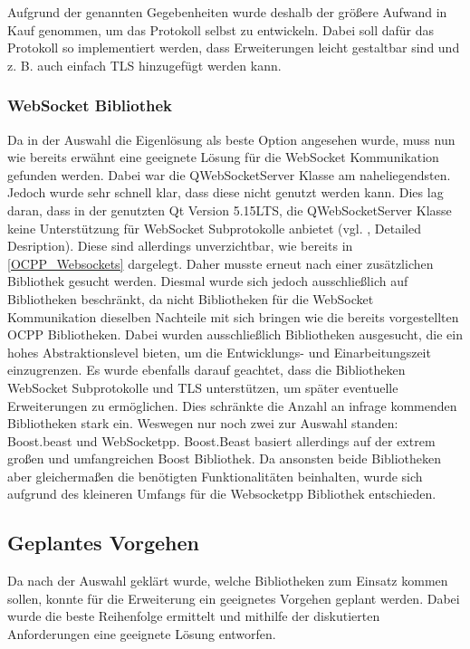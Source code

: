 \noindent Aufgrund der genannten Gegebenheiten wurde deshalb der größere Aufwand in Kauf genommen, um das Protokoll selbst zu entwickeln. Dabei soll dafür das Protokoll so implementiert werden, dass Erweiterungen leicht gestaltbar sind und z. B. auch einfach TLS hinzugefügt werden kann.
\subsubsection{WebSocket Bibliothek}
Da in der Auswahl die Eigenlösung als beste Option angesehen wurde, muss nun wie bereits erwähnt eine geeignete Lösung für die WebSocket Kommunikation gefunden werden. Dabei war die QWebSocketServer Klasse am naheliegendsten. Jedoch wurde sehr schnell klar, dass diese nicht genutzt werden kann. Dies lag daran, dass in der genutzten Qt Version 5.15LTS, die QWebSocketServer Klasse keine Unterstützung für WebSocket Subprotokolle anbietet (vgl. \cite{QWebsocketServer}, \glqq{}Detailed Desription\grqq{}). Diese sind allerdings unverzichtbar, wie bereits in \autoref{OCPP_Websockets} dargelegt. Daher musste erneut nach einer zusätzlichen Bibliothek gesucht werden. \newline
\noindent Diesmal wurde sich jedoch ausschließlich auf \cpp Bibliotheken beschränkt, da nicht \cpp Bibliotheken für die WebSocket Kommunikation dieselben Nachteile mit sich bringen wie die bereits vorgestellten OCPP Bibliotheken. Dabei wurden ausschließlich Bibliotheken ausgesucht, die ein hohes Abstraktionslevel bieten, um die Entwicklungs- und Einarbeitungszeit einzugrenzen. Es wurde ebenfalls darauf geachtet, dass die Bibliotheken WebSocket Subprotokolle und TLS unterstützen, um später eventuelle Erweiterungen zu ermöglichen. Dies schränkte die Anzahl an infrage kommenden Bibliotheken stark ein. Weswegen nur noch zwei zur Auswahl standen: Boost.beast\cite{Boost-beast} und  WebSocketpp\cite{Websocketpp}. Boost.Beast basiert allerdings auf der extrem großen und umfangreichen Boost Bibliothek. Da ansonsten beide Bibliotheken aber gleichermaßen die benötigten Funktionalitäten beinhalten, wurde sich aufgrund des kleineren Umfangs für die Websocketpp Bibliothek entschieden.

\subsection{Geplantes Vorgehen}
Da nach der Auswahl geklärt wurde, welche Bibliotheken zum Einsatz kommen sollen, konnte für die Erweiterung ein geeignetes Vorgehen geplant werden. Dabei wurde die beste Reihenfolge ermittelt und mithilfe der diskutierten Anforderungen eine geeignete Lösung entworfen.
